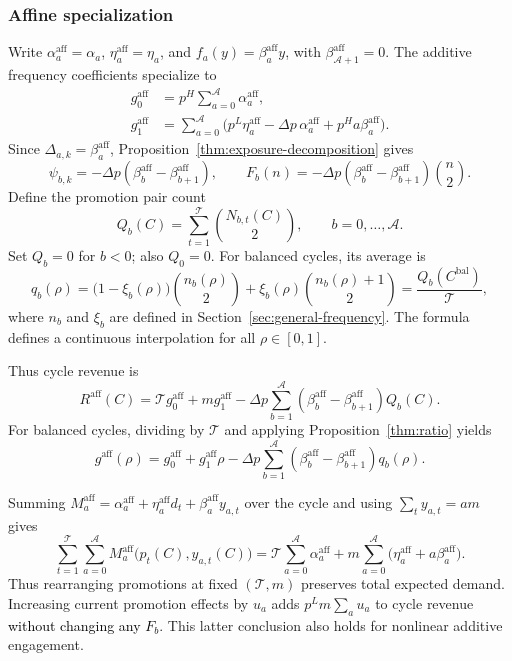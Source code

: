 \subsubsection{Affine specialization}
Write \(\alpha_a^{\mathrm{aff}}=\alpha_a\), \(\eta_a^{\mathrm{aff}}=\eta_a\), and \(f_a(y)=\beta_a^{\mathrm{aff}}y\), with \(\beta_{\mathcal A+1}^{\mathrm{aff}}=0\). The additive frequency coefficients specialize to
\[
\begin{aligned}
 g_0^{\mathrm{aff}}&=p^H\sum_{a=0}^{\mathcal A}\alpha_a^{\mathrm{aff}},\\
 g_1^{\mathrm{aff}}&=\sum_{a=0}^{\mathcal A}
 \bigl(p^L\eta_a^{\mathrm{aff}}-\Delta p\,\alpha_a^{\mathrm{aff}}
       +p^Ha\beta_a^{\mathrm{aff}}\bigr).
\end{aligned}
\]
Since \(\Delta_{a,k}=\beta_a^{\mathrm{aff}}\), Proposition~\ref{thm:exposure-decomposition} gives
\[
 \psi_{b,k}=-\Delta p(\beta_b^{\mathrm{aff}}-\beta_{b+1}^{\mathrm{aff}}),
 \qquad
 F_b(n)=-\Delta p(\beta_b^{\mathrm{aff}}-\beta_{b+1}^{\mathrm{aff}})\binom n2.
\]
\begingroup\color{blue}
Define the promotion pair count
\[
 Q_b(C)=\sum_{t=1}^{\mathcal T}\binom{N_{b,t}(C)}{2},
 \qquad b=0,\ldots,\mathcal A.
\]
Set \(Q_b=0\) for \(b<0\); also \(Q_0=0\). For balanced cycles, its average is
\[
 q_b(\rho)=\bigl(1-\xi_b(\rho)\bigr)\binom{n_b(\rho)}{2}
           +\xi_b(\rho)\binom{n_b(\rho)+1}{2}
           =\frac{Q_b(C^{\mathrm{bal}})}{\mathcal T},
\]
where \(n_b\) and \(\xi_b\) are defined in Section~\ref{sec:general-frequency}. The formula defines a continuous interpolation for all \(\rho\in[0,1]\).
\par\endgroup
Thus cycle revenue is
\begin{equation}\label{eq:affine-revenue}
 R^{\mathrm{aff}}(C)=\mathcal T g_0^{\mathrm{aff}}+mg_1^{\mathrm{aff}}
 -\Delta p\sum_{b=1}^{\mathcal A}
 (\beta_b^{\mathrm{aff}}-\beta_{b+1}^{\mathrm{aff}})Q_b(C).
\end{equation}
For balanced cycles, dividing by \(\mathcal T\) and applying Proposition~\ref{thm:ratio} yields
\begin{equation}\label{eq:g-rho}
 g^{\mathrm{aff}}(\rho)=g_0^{\mathrm{aff}}+g_1^{\mathrm{aff}}\rho
 -\Delta p\sum_{b=1}^{\mathcal A}
 (\beta_b^{\mathrm{aff}}-\beta_{b+1}^{\mathrm{aff}})q_b(\rho).
\end{equation}

Summing \(M_a^{\mathrm{aff}}=\alpha_a^{\mathrm{aff}}+\eta_a^{\mathrm{aff}}d_t+\beta_a^{\mathrm{aff}}y_{a,t}\) over the cycle and using \(\sum_t y_{a,t}=am\) gives
\[
 \sum_{t=1}^{\mathcal T}\sum_{a=0}^{\mathcal A}
 M_a^{\mathrm{aff}}\bigl(p_t(C),y_{a,t}(C)\bigr)
 =\mathcal T\sum_{a=0}^{\mathcal A}\alpha_a^{\mathrm{aff}}
   +m\sum_{a=0}^{\mathcal A}
       \bigl(\eta_a^{\mathrm{aff}}+a\beta_a^{\mathrm{aff}}\bigr).
\]
Thus rearranging promotions at fixed \((\mathcal T,m)\) preserves total expected demand. Increasing current promotion effects by \(u_a\) adds \(p^Lm\sum_a u_a\) to cycle revenue \textcolor{black}{without changing any \(F_b\)}. This latter conclusion also holds for nonlinear additive engagement.

